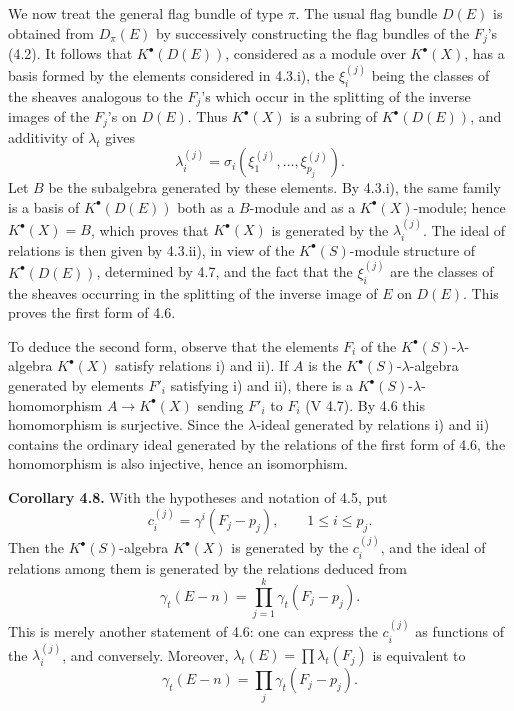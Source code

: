 \documentclass[11pt]{article}
\begin{document}
We now treat the general flag bundle of type \(\pi\). The usual flag bundle \(D(E)\) is obtained from \(D_\pi(E)\) by successively constructing the flag bundles of the \(F_j\)'s (4.2). It follows that \(K^\bullet(D(E))\), considered as a module over \(K^\bullet(X)\), has a basis formed by the elements considered in 4.3.i), the \(\xi_i^{(j)}\) being the classes of the sheaves analogous to the \(F_j\)'s which occur in the splitting of the inverse images of the \(F_j\)'s on \(D(E)\). Thus \(K^\bullet(X)\) is a subring of \(K^\bullet(D(E))\), and additivity of \(\lambda_t\) gives
\[
  \lambda_i^{(j)}=\sigma_i(\xi_1^{(j)},\ldots,\xi_{p_j}^{(j)}).
\]
Let \(B\) be the subalgebra generated by these elements. By 4.3.i), the same family is a basis of \(K^\bullet(D(E))\) both as a \(B\)-module and as a \(K^\bullet(X)\)-module; hence \(K^\bullet(X)=B\), which proves that \(K^\bullet(X)\) is generated by the \(\lambda_i^{(j)}\). The ideal of relations is then given by 4.3.ii), in view of the \(K^\bullet(S)\)-module structure of \(K^\bullet(D(E))\), determined by 4.7, and the fact that the \(\xi_i^{(j)}\) are the classes of the sheaves occurring in the splitting of the inverse image of \(E\) on \(D(E)\). This proves the first form of 4.6.

To deduce the second form, observe that the elements \(F_i\) of the \(K^\bullet(S)\)-\(\lambda\)-algebra \(K^\bullet(X)\) satisfy relations i) and ii). If \(A\) is the \(K^\bullet(S)\)-\(\lambda\)-algebra generated by elements \(F'_i\) satisfying i) and ii), there is a \(K^\bullet(S)\)-\(\lambda\)-homomorphism \(A\to K^\bullet(X)\) sending \(F'_i\) to \(F_i\) (V 4.7). By 4.6 this homomorphism is surjective. Since the \(\lambda\)-ideal generated by relations i) and ii) contains the ordinary ideal generated by the relations of the first form of 4.6, the homomorphism is also injective, hence an isomorphism.

\textbf{Corollary 4.8.} With the hypotheses and notation of 4.5, put
\[
  c_i^{(j)}=\gamma^i(F_j-p_j),
  \qquad 1\leq i\leq p_j .
\]
Then the \(K^\bullet(S)\)-algebra \(K^\bullet(X)\) is generated by the \(c_i^{(j)}\), and the ideal of relations among them is generated by the relations deduced from
\[
  \gamma_t(E-n)=\prod_{j=1}^{k}\gamma_t(F_j-p_j).
\]
This is merely another statement of 4.6: one can express the \(c_i^{(j)}\) as functions of the \(\lambda_i^{(j)}\), and conversely. Moreover, \(\lambda_t(E)=\prod\lambda_t(F_j)\) is equivalent to
\[
  \gamma_t(E-n)=\prod_j \gamma_t(F_j-p_j).
\]
\end{document}
